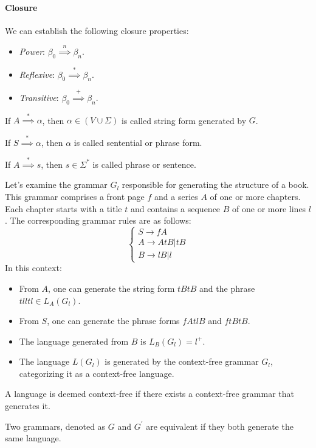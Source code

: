 \paragraph*{Closure}
We can establish the following closure properties:
\begin{itemize}
    \item \textit{Power}: $\beta_0 \overset{n}{\implies} \beta_n$. 
    \item \textit{Reflexive}: $\beta_0 \overset{*}{\implies} \beta_n$. 
    \item \textit{Transitive}: $\beta_0 \overset{+}{\implies} \beta_n$. 
\end{itemize}
\begin{definition}
    If $A \overset{*}{\implies} \alpha$, then $\alpha \in (V \cup \Sigma)$ is called string form generated by $G$. 
\end{definition}
\begin{definition}
    If $S \overset{*}{\implies} \alpha$, then $\alpha$ is called sentential or phrase form.
\end{definition}
\begin{definition}
    If $A \overset{*}{\implies} s$, then $s \in \Sigma^{*}$ is called phrase or sentence. 
\end{definition}
\begin{example}
    Let's examine the grammar $G_l$ responsible for generating the structure of a book.
    This grammar comprises a front page $f$ and a series $A$ of one or more chapters.
    Each chapter starts with a title $t$ and contains a sequence $B$ of one or more lines $l$.
    The corresponding grammar rules are as follows:
    \[\begin{cases}
        S \rightarrow fA \\
        A \rightarrow AtB | tB \\
        B \rightarrow lB | l
    \end{cases}\]
    In this context:
    \begin{itemize}
        \item From $A$, one can generate the string form $tBtB$ and the phrase $tlltl \in L_A(G_l)$.
        \item From $S$, one can generate the phrase forms $fAtlB$ and $ftBtB$. 
        \item The language generated from $B$ is $L_B(G_l)=l^{+}$.
        \item The language $L(G_l)$ is generated by the context-free grammar $G_l$, categorizing it as a context-free language.
    \end{itemize}
\end{example}
\begin{definition}
    A language is deemed context-free if there exists a context-free grammar that generates it.
\end{definition}
\begin{definition}
    Two grammars, denoted as $G$ and $G^{'}$ are equivalent if they both generate the same language.
\end{definition}